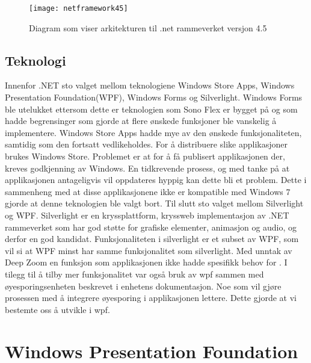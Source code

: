 \begin{figure}[ht]
\centering
\texttt{[image: netframework45]}
\caption{Diagram som viser arkitekturen til .net rammeverket versjon 4.5}
\label{fig:net-arkitektur}
\end{figure}

\subsection{Teknologi}

Innenfor .NET sto valget mellom teknologiene Windows Store Apps, Windows Presentation Foundation(\gls{WPF}), Windows Forms og Silverlight.  Windows Forms ble utelukket ettersom dette er teknologien som Sono Flex er bygget på og som hadde begrensinger som gjorde at flere ønskede funksjoner ble vanskelig å implementere. Windows Store Apps hadde mye av den ønskede funksjonaliteten, samtidig som den fortsatt vedlikeholdes. For å distribuere slike applikasjoner brukes Windows Store. Problemet er at for å få publisert applikasjonen der, kreves godkjenning av Windows. En tidkrevende prosess, og med tanke på at applikasjonen antageligvis vil oppdateres hyppig kan dette bli et problem. Dette i sammenheng med at disse applikasjonene ikke er kompatible med Windows 7\cite{Windo0:online} gjorde at denne teknologien ble valgt bort. Til slutt sto valget mellom Silverlight og WPF. Silverlight er en kryssplattform, kryssweb implementasjon av .NET rammeverket som har god støtte for grafiske elementer, animasjon og audio, og derfor en god kandidat. Funksjonaliteten i silverlight er et subset av WPF, som vil si at WPF minst har samme funksjonalitet som silverlight. Med unntak av Deep Zoom en funksjon som applikasjonen ikke hadde spesifikk behov for \cite{WPFvsSilverlight:online}. I tilegg til å tilby mer funksjonalitet var også bruk av wpf sammen med øyesporingsenheten beskrevet i enhetens dokumentasjon. Noe som vil gjøre prosessen med å integrere øyesporing i applikasjonen lettere. Dette gjorde at vi bestemte oss å utvikle i wpf.


\section{Windows Presentation Foundation}

